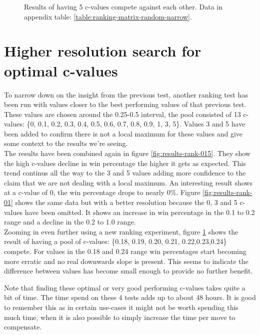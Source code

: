 \documentclass[
11pt, %
english, %
singlespacing, %
headsepline, %
]{MastersDoctoralThesis} %
\begin{document}
\begin{figure}[t]
\begin{minipage}[t]{0.5\textwidth}
		\caption{Results of having 5 c-values compete against each other. Data in appendix table: \ref{table:ranking-matrix-random-narrow}.}
		\label{fig:results-rank-narrow}
	\end{minipage}
\end{figure}

\section{Higher resolution search for optimal c-values}
To narrow down on the insight from the previous test, another ranking test has been run with values closer to the best performing values of that previous test. These values are chosen around the 0.25-0.5 interval, the pool consisted of 13 c-values: \{0, 0.1, 0.2, 0.3, 0.4, 0.5, 0.6, 0.7, 0.8, 0.9, 1, 3, 5\}. Values 3 and 5 have been added to confirm there is not a local maximum for these values and give some context to the results we're seeing.\\

The results have been combined again in figure \ref{fig:results-rank-015}. They show the high c-values decline in win percentage the higher it gets as expected. This trend continus all the way to the 3 and 5 values adding more confidence to the claim that we are not dealing with a local maximum. An interesting result shows at a c-value of 0, the win percentage drops to nearly $0\%$.
Figure \ref{fig:results-rank-01} shows the same data but with a better resolution because the 0, 3 and 5 c-values have been omitted. It shows an increase in win percentage in the 0.1 to 0.2 range and a decline in the 0.2 to 1.0 range.\\

Zooming in even further using a new ranking experiment, figure \ref{fig:results-rank-narrow} shows the result of having a pool of c-values: \{0.18, 0.19, 0.20, 0.21, 0.22,0.23,0.24\} compete. For values in the 0.18 and 0.24 range win percentages start becoming more erratic and no real downwards slope is present. This seems to indicate the difference between values has become small enough to provide no further benefit.

Note that finding these optimal or very good performing c-values takes quite a bit of time. The time spend on these 4 tests adds up to about 48 hours. It is good to remember this as in certain use-cases it might not be worth spending this much time, when it is also possible to simply increase the time per move to compensate.
\end{document}
